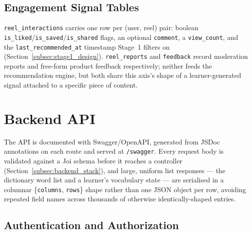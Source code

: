     \subsection{Engagement Signal Tables}
    \label{subsec:schema_engagement}
    \begin{sloppypar}
    \texttt{reel\_interactions} carries one row per (user, reel) pair: boolean \texttt{is\_liked}/\texttt{is\_saved}/\texttt{is\_shared} flags, an optional \texttt{comment}, a \texttt{view\_count}, and the \texttt{last\_recommended\_at} timestamp Stage~1 filters on (Section~\ref{subsec:stage1_design}). \texttt{reel\_reports} and \texttt{feedback} record moderation reports and free-form product feedback respectively; neither feeds the recommendation engine, but both share this axis's shape of a learner-generated signal attached to a specific piece of content.
    \end{sloppypar}


\section{Backend API}
\label{sec:backend_api}
    The API is documented with Swagger/OpenAPI, generated from JSDoc annotations on each route and served at \texttt{/swagger}. Every request body is validated against a Joi schema before it reaches a controller (Section~\ref{subsec:backend_stack}), and large, uniform list responses --- the dictionary word list and a learner's vocabulary state --- are serialised in a columnar \{\texttt{columns}, \texttt{rows}\} shape rather than one JSON object per row, avoiding repeated field names across thousands of otherwise identically-shaped entries.

    \subsection{Authentication and Authorization}
    \label{subsec:auth_impl}
